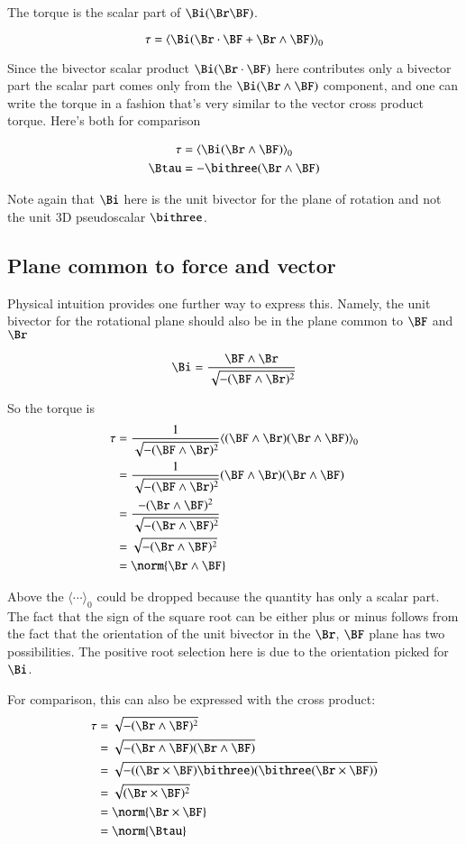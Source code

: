 The torque is the scalar part of $\Bi (\Br \BF)$.

\[
\tau 
   =  {\langle \Bi (\Br \cdot \BF + \Br \wedge \BF) \rangle}_0 \\
\]

Since the bivector scalar product $\Bi (\Br \cdot \BF)$ here contributes only a bivector part the scalar part comes only from the $\Bi (\Br \wedge \BF)$ component,
and one can write the torque in a fashion that's very similar to the vector cross product torque.  Here's both for comparison

\begin{align*}
\tau &=  {\langle \Bi (\Br \wedge \BF) \rangle}_0 \\
\Btau &= -\bithree (\Br \wedge \BF)
\end{align*}

Note again that $\Bi$ here is the unit bivector for the plane of rotation and not the unit 3D pseudoscalar $\bithree$.

\subsection{Plane common to force and vector}
Physical intuition provides one further way to express this.  Namely, the unit bivector for the rotational plane should also be in the plane common to $\BF$ and $\Br$

\[
\Bi = \frac{\BF \wedge \Br}{\sqrt{-(\BF \wedge \Br)^2}}
\]

So the torque is
\begin{align*}
\tau 
   &=  \frac{1}{\sqrt{-(\BF \wedge \Br)^2}} {\langle (\BF \wedge \Br)(\Br \wedge \BF) \rangle}_0 \\
   &=  \frac{1}{\sqrt{-(\BF \wedge \Br)^2}} {(\BF \wedge \Br)(\Br \wedge \BF) } \\
   &=  \frac {-(\Br \wedge \BF)^2 } {\sqrt{-(\Br \wedge \BF)^2}} \\
   &=  \sqrt {-(\Br \wedge \BF)^2 } \\
   &=  \norm {\Br \wedge \BF}
\end{align*}

Above the ${\langle \cdots \rangle}_0$ could be dropped because the quantity has only a scalar part.
The fact that the sign of the square root can be either plus or minus follows from the fact that the orientation of the unit bivector in the $\Br$, $\BF$ plane has two possibilities.  The positive root selection here is due to the orientation picked for $\Bi$.  

For comparison, this can also be expressed with the cross product:
\begin{align*}
\tau 
   &=  \sqrt {-(\Br \wedge \BF)^2 } \\
   &=  \sqrt {-(\Br \wedge \BF)(\Br \wedge \BF) } \\
   &=  \sqrt {-((\Br \times \BF)\bithree)(\bithree(\Br \times \BF)) } \\
   &=  \sqrt {(\Br \times \BF)^2} \\
   &=  \norm{\Br \times \BF} \\
   &=  \norm{\Btau} \\
\end{align*}


